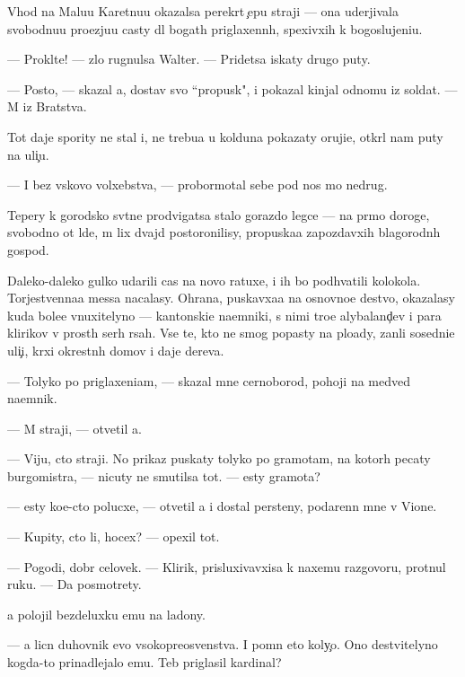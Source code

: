 \documentclass[10pt]{book}
\begin{document}
V{\yi}hod na Malu{\y}u Karetnu{\y}u okazalsa perekr{\yi}t {\c}ep{\y}u straji — ona uderjivala svobodnu{\y}u pro{\y}ezju{\y}u casty dl{\ia} bogat{\yi}h priglaxenn{\yi}h, spexivxih k bogoslujeni{\y}u.

— Prokl{\ia}t{\y}e! — zlo rugnulsa Walter. — Pridetsa iskaty drugo{\y} puty.

— Posto{\y}, — skazal {\y}a, dostav svo{\y} ``propusk", i pokazal kinjal odnomu iz soldat. — M{\yi} iz Bratstva.

Tot daje spority ne stal i, ne trebu{\y}a u kolduna pokazaty oruji{\y}e, otkr{\yi}l nam puty na uli{\c}u.

— I bez vs{\ia}kovo volxebstva, — probormotal sebe pod nos mo{\y} nedrug.

Tepery k gorodsko{\y} sv{\ia}t{\yi}ne prodvigatsa stalo gorazdo legce — na pr{\ia}mo{\y} doroge, svobodno{\y} ot l{\iu}de{\y}, m{\yi} lix dvajd{\yi} postoronilisy, propuska{\y}a zapozdavxih blagorodn{\yi}h gospod.

Daleko-daleko gulko udarili cas{\yi} na novo{\y} ratuxe, i ih bo{\y} podhvatili kolokola. Torjestvenna{\y}a messa nacalasy. Ohrana, puskavxa{\y}a na osnovno{\y}e de{\y}stvo, okazalasy kuda bole{\y}e vnuxitelyno{\y} — kantonski{\y}e na{\y}emniki, s nimi tro{\y}e alybaland{\c}ev i para klirikov v prost{\yi}h ser{\yi}h r{\ia}sah. Vse te, kto ne smog popasty na plo{\x}ady, zan{\ia}li sosedni{\y}e uli{\c}i, kr{\yi}xi okrestn{\yi}h domov i daje derev{\y}a.

— Tolyko po priglaxeni{\y}am, — skazal mne cernoborod{\yi}{\y}, pohoji{\y} na medved{\ia} na{\y}emnik.

— M{\yi} straji, — otvetil {\y}a.

— Viju, cto straji. No prikaz puskaty tolyko po gramotam, na kotor{\yi}h pecaty burgomistra, — nicuty ne smutilsa tot. — {\Y}esty gramota?

— {\Y}esty ko{\y}e-cto polucxe, — otvetil {\y}a i dostal persteny, podarenn{\yi}{\y} mne v Vione.

— Kupity, cto li, hocex? — opexil tot.

— Pogodi, dobr{\yi}{\y} celovek. — Klirik, prisluxivavxi{\y}sa k naxemu razgovoru, prot{\ia}nul ruku. — Da{\y} posmotrety.

{\Y}a polojil bezdeluxku {\y}emu na ladony.

— {\Y}a licn{\yi}{\y} duhovnik {\y}evo v{\yi}sokopreosv{\ia}{\x}enstva. I pomn{\iu} eto koly{\c}o. Ono de{\y}stvitelyno kogda-to prinadlejalo {\y}emu. Teb{\ia} priglasil kardinal?
\end{document}
